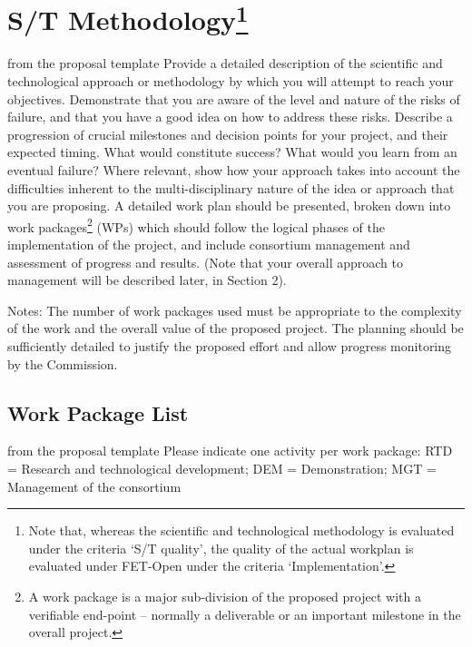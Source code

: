 \section[S/T Methodology]{S/T Methodology\footnote{Note that, whereas the scientific and technological methodology is evaluated
under the criteria ‘S/T quality’, the quality of the
actual workplan is evaluated under FET-Open under the criteria ‘Implementation’.}}\label{sec:methodology}
\begin{todo}{from the proposal template}
Provide a detailed description of the scientific and technological approach or methodology
by which you will attempt to reach your objectives. Demonstrate that you are aware of the
level and nature of the risks of failure, and that you have a good idea on how to address
these risks. Describe a progression of crucial milestones and decision points for your
project, and their expected timing. What would constitute success? What would you learn
from an eventual failure? Where relevant, show how your approach takes into account the
difficulties inherent to the multi-disciplinary nature of the idea or approach that you
are proposing. 
 A detailed work plan should be presented, broken down into work
packages\footnote{A work package is a major sub-division of the proposed project with a
  verifiable end-point – normally a deliverable or an important milestone in the overall
  project.} (WPs) which should follow the logical phases of the implementation of the
project, and include consortium management and assessment of progress and results. (Note
that your overall approach to management will be described later, in Section 2).

Notes: The number of work packages used must be appropriate to the complexity of the work
and the overall value of the proposed project. The planning should be sufficiently
detailed to justify the proposed effort and allow progress monitoring by the Commission.

\end{todo}
\newpage

\newpage
\subsection{Work Package List}\label{sec:wplist}

\begin{todo}{from the proposal template}
Please indicate one activity per work package:
RTD = Research and technological development; DEM = Demonstration; MGT = Management of the consortium
\end{todo}

